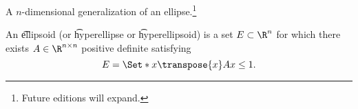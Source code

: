 

A $n$-dimensional generalization of an ellipse.\footnote{Future editions will expand.}


An \t{ellipsoid} (or \t{hyperellipse} or \t{hyperellipsoid}) is a set $E \subset \R^{n}$ for which there exists $A \in \R^{n \times n}$ positive definite satisfying
\[
  E = \Set*{x}{\transpose{x}Ax \leq 1}.
\]

\blankpage
